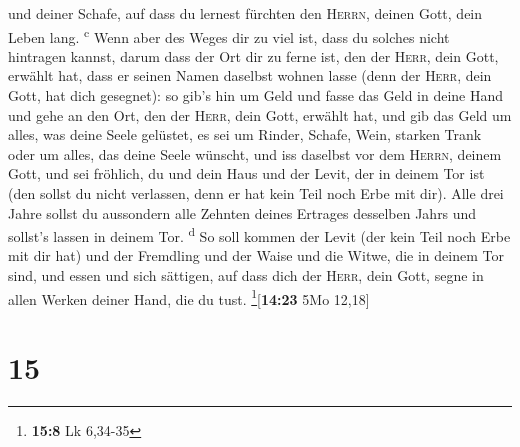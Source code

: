und deiner Schafe, auf dass du lernest fürchten den \textsc{Herrn},
deinen Gott, dein Leben lang. \textsuperscript{c}  Wenn
aber des Weges dir zu viel ist, dass du solches nicht hintragen kannst,
darum dass der Ort dir zu ferne ist, den der \textsc{Herr}, dein Gott,
erwählt hat, dass er seinen Namen daselbst wohnen lasse (denn der
\textsc{Herr}, dein Gott, hat dich gesegnet):  so gib's
hin um Geld und fasse das Geld in deine Hand und gehe an den Ort, den
der \textsc{Herr}, dein Gott, erwählt hat,  und gib das
Geld um alles, was deine Seele gelüstet, es sei um Rinder, Schafe, Wein,
starken Trank oder um alles, das deine Seele wünscht, und iss daselbst
vor dem \textsc{Herrn}, deinem Gott, und sei fröhlich, du und dein Haus
 und der Levit, der in deinem Tor ist (den sollst du
nicht verlassen, denn er hat kein Teil noch Erbe mit dir).
 Alle drei Jahre sollst du aussondern alle Zehnten deines
Ertrages desselben Jahrs und sollst's lassen in deinem Tor.
\textsuperscript{d}  So soll kommen der Levit (der kein
Teil noch Erbe mit dir hat) und der Fremdling und der Waise und die
Witwe, die in deinem Tor sind, und essen und sich sättigen, auf dass
dich der \textsc{Herr}, dein Gott, segne in allen Werken deiner Hand,
die du tust. \footnote{\textbf{15:8} Lk 6,34-35}{[}\textbf{14:23} 5Mo
12,18{]}

\hypertarget{section-14}{%
\section{15}\label{section-14}}

